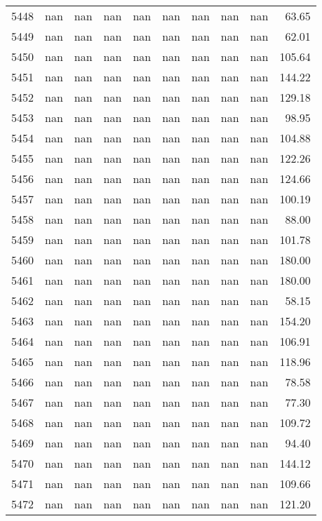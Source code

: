 \begin{tabular}{lrrrrrrrrr}
5448 & nan & nan & nan & nan & nan & nan & nan & nan & 63.65 \\
5449 & nan & nan & nan & nan & nan & nan & nan & nan & 62.01 \\
5450 & nan & nan & nan & nan & nan & nan & nan & nan & 105.64 \\
5451 & nan & nan & nan & nan & nan & nan & nan & nan & 144.22 \\
5452 & nan & nan & nan & nan & nan & nan & nan & nan & 129.18 \\
5453 & nan & nan & nan & nan & nan & nan & nan & nan & 98.95 \\
5454 & nan & nan & nan & nan & nan & nan & nan & nan & 104.88 \\
5455 & nan & nan & nan & nan & nan & nan & nan & nan & 122.26 \\
5456 & nan & nan & nan & nan & nan & nan & nan & nan & 124.66 \\
5457 & nan & nan & nan & nan & nan & nan & nan & nan & 100.19 \\
5458 & nan & nan & nan & nan & nan & nan & nan & nan & 88.00 \\
5459 & nan & nan & nan & nan & nan & nan & nan & nan & 101.78 \\
5460 & nan & nan & nan & nan & nan & nan & nan & nan & 180.00 \\
5461 & nan & nan & nan & nan & nan & nan & nan & nan & 180.00 \\
5462 & nan & nan & nan & nan & nan & nan & nan & nan & 58.15 \\
5463 & nan & nan & nan & nan & nan & nan & nan & nan & 154.20 \\
5464 & nan & nan & nan & nan & nan & nan & nan & nan & 106.91 \\
5465 & nan & nan & nan & nan & nan & nan & nan & nan & 118.96 \\
5466 & nan & nan & nan & nan & nan & nan & nan & nan & 78.58 \\
5467 & nan & nan & nan & nan & nan & nan & nan & nan & 77.30 \\
5468 & nan & nan & nan & nan & nan & nan & nan & nan & 109.72 \\
5469 & nan & nan & nan & nan & nan & nan & nan & nan & 94.40 \\
5470 & nan & nan & nan & nan & nan & nan & nan & nan & 144.12 \\
5471 & nan & nan & nan & nan & nan & nan & nan & nan & 109.66 \\
5472 & nan & nan & nan & nan & nan & nan & nan & nan & 121.20 \\

\end{tabular}

